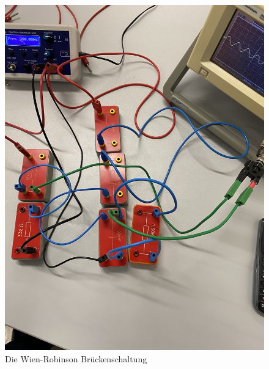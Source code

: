   \begin{figure}
    \centering
    \includegraphics{Bilder/wien.jpg}
    \caption{Die Wien-Robinson Brückenschaltung}
    \label{fig:wheat}
  \end{figure}
